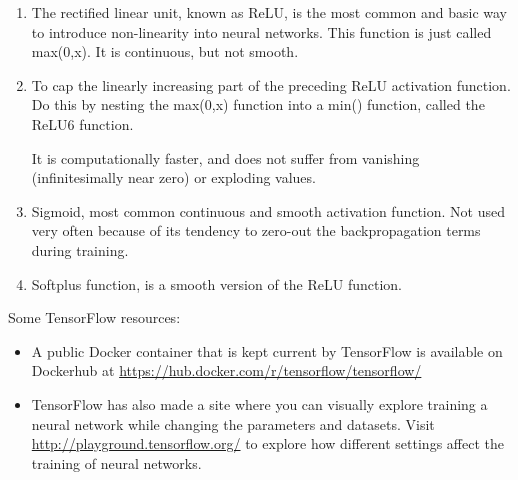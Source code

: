 \documentclass[twoside]{article}
\begin{document}
\begin{enumerate}
\item The rectified linear unit, known as ReLU, is the most common and basic way to introduce non-linearity into neural networks. This function is just called max(0,x). It is continuous, but not smooth.

\item To cap the linearly increasing part of the preceding ReLU activation function. Do this by nesting the max(0,x) function into a min() function, called the ReLU6 function.

It is computationally faster, and does not suffer from vanishing (infinitesimally near zero) or exploding values.

\item Sigmoid, most common continuous and smooth activation function. Not used very often because of its tendency to zero-out the backpropagation terms during training.

\item Softplus function, is a smooth version of the ReLU function.
\end{enumerate}



Some TensorFlow resources:
\begin{itemize}
\item A public Docker container that is kept current by TensorFlow is available on Dockerhub at \url{https://hub.docker.com/r/tensorflow/tensorflow/}

\item TensorFlow has also made a site where you can visually explore training a neural network while changing the parameters and datasets. Visit \url{http://playground.tensorflow.org/} to explore how different settings affect the training of neural networks.


\end{itemize}
\end{document}
